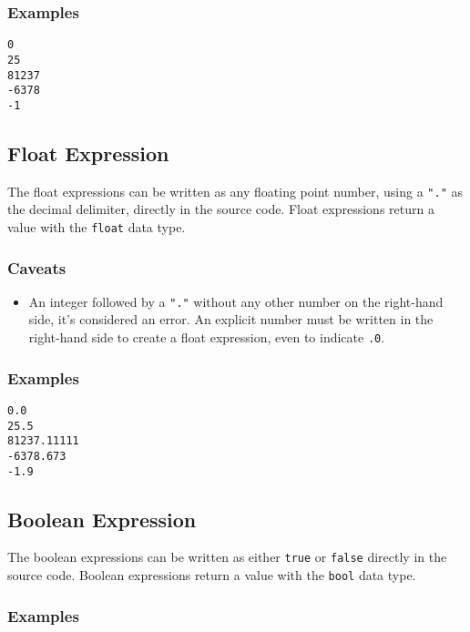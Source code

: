 \subsubsection{Examples}

\begin{verbatim}
0
25
81237
-6378
-1
\end{verbatim}

\subsection{Float Expression}

The float expressions can be written as any floating point number, using a \texttt{"."} as the decimal delimiter, directly in the source code.
Float expressions return a value with the \texttt{float} data type.

\subsubsection{Caveats}

\begin{itemize}
    \item An integer followed by a \texttt{"."} without any other number on the right-hand side, it's considered an error. An explicit number
        must be written in the right-hand side to create a float expression, even to indicate \texttt{.0}.
\end{itemize}
\clearpage
\subsubsection{Examples}

\begin{verbatim}
0.0
25.5
81237.11111
-6378.673
-1.9
\end{verbatim}

\subsection{Boolean Expression}

The boolean expressions can be written as either \texttt{true} or \texttt{false} directly in the source code.
Boolean expressions return a value with the \texttt{bool} data type.

\subsubsection{Examples}

